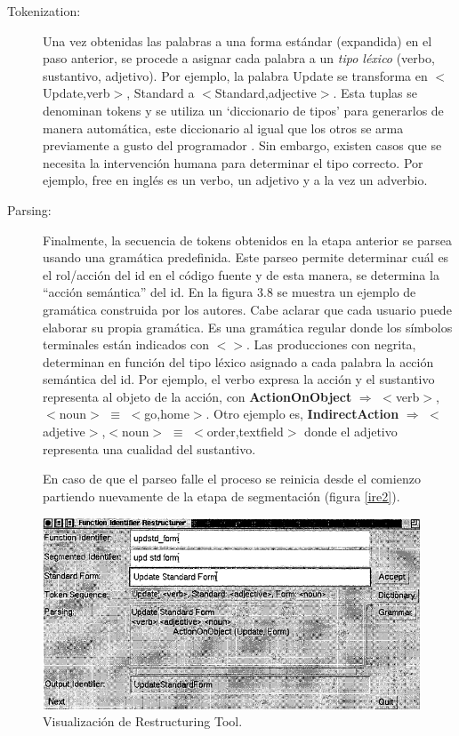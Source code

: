 \documentclass[a4paper,12pt]{report}
\begin{document}
\begin{description}
\item[Tokenization:] Una vez obtenidas las palabras a una forma estándar (expandida) en el paso anterior, se procede a asignar cada palabra a un \textit{tipo léxico} (verbo, sustantivo, adjetivo). Por ejemplo, la palabra \textsf{Update} se transforma en $<$Update,verb$>$, \textsf{Standard} a $<$Standard,adjective$>$. Esta tuplas se denominan tokens y se utiliza un `diccionario de tipos' para generarlos de manera automática, este diccionario al igual que los otros se arma previamente a gusto del programador \cite{BCPT99}. Sin embargo, existen casos que se necesita la intervención humana para determinar el tipo correcto. Por ejemplo, \textsf{free} en inglés es un verbo, un adjetivo y a la vez un adverbio.%

\item[Parsing:] Finalmente, la secuencia de tokens obtenidos en la etapa anterior se parsea usando una gramática predefinida. Este parseo permite determinar cuál es el rol/acción del id en el código fuente y de esta manera, se determina la “acción semántica” del id. 
En la figura 3.8 se muestra un ejemplo de gramática construida por los autores. Cabe aclarar que cada usuario puede elaborar su propia gramática. 
Es una gramática regular donde los símbolos terminales están indicados con $<>$. Las producciones con negrita, determinan en función del tipo léxico asignado a cada palabra la acción semántica del id.
Por ejemplo, el verbo expresa la acción y el sustantivo representa al objeto de la acción, con \textbf{ActionOnObject} $\Rightarrow$ $<$verb$>$,$<$noun$>$ $\equiv$ $<$go,home$>$. Otro ejemplo es, \textbf{IndirectAction} $\Rightarrow$ $<$adjetive$>$,$<$noun$>$ $\equiv$ $<$order,textfield$>$ donde el adjetivo representa una cualidad del sustantivo.

En caso de que el parseo falle el proceso se reinicia desde el comienzo partiendo nuevamente de la etapa de segmentación \cite{BCPT00} (figura \ref{ire2}).
\end{description}

\begin{figure}[ht] %
\centering
\includegraphics[scale= 0.67]{./ire_4.png}
\caption{Visualización de Restructuring Tool.}
\label{ire4}
\end{figure}
\end{document}
